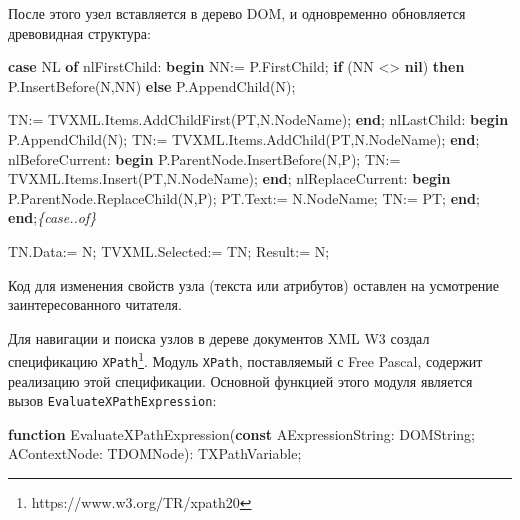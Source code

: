 \documentclass[
]{article}
\newenvironment{Shaded}{}{}
\newcommand{\CommentTok}[1]{\textcolor[rgb]{0.38,0.63,0.69}{\textit{#1}}}
\newcommand{\DataTypeTok}[1]{\textcolor[rgb]{0.56,0.13,0.00}{#1}}
\newcommand{\KeywordTok}[1]{\textcolor[rgb]{0.00,0.44,0.13}{\textbf{#1}}}
\newcommand{\NormalTok}[1]{#1}
\begin{document}
После этого узел вставляется в дерево DOM, и одновременно обновляется
древовидная структура:

\begin{Shaded}
\begin{Highlighting}[]
\KeywordTok{case}\NormalTok{ NL }\KeywordTok{of}
\NormalTok{     nlFirstChild:}
                  \KeywordTok{begin}
\NormalTok{                    NN:= P.FirstChild;}
                    \KeywordTok{if}\NormalTok{ (NN \textless{}\textgreater{} }\KeywordTok{nil}\NormalTok{) }\KeywordTok{then}
\NormalTok{                      P.InsertBefore(N,NN)}
                    \KeywordTok{else}
\NormalTok{                      P.AppendChild(N);}

\NormalTok{                    TN:= TVXML.Items.AddChildFirst(PT,N.NodeName);}
                  \KeywordTok{end}\NormalTok{;}
\NormalTok{      nlLastChild:}
                  \KeywordTok{begin}
\NormalTok{                    P.AppendChild(N);}
\NormalTok{                    TN:= TVXML.Items.AddChild(PT,N.NodeName);}
                  \KeywordTok{end}\NormalTok{;}
\NormalTok{  nlBeforeCurrent:}
                  \KeywordTok{begin}
\NormalTok{                    P.ParentNode.InsertBefore(N,P);}
\NormalTok{                    TN:= TVXML.Items.Insert(PT,N.NodeName);}
                  \KeywordTok{end}\NormalTok{;}
\NormalTok{ nlReplaceCurrent:}
                  \KeywordTok{begin}
\NormalTok{                    P.ParentNode.ReplaceChild(N,P);}
\NormalTok{                    PT.}\DataTypeTok{Text}\NormalTok{:= N.NodeName;}
\NormalTok{                    TN:= PT;}
                  \KeywordTok{end}\NormalTok{;}
  \KeywordTok{end}\NormalTok{;}\CommentTok{\{case..of\}}

\NormalTok{  TN.Data:= N;}
\NormalTok{  TVXML.Selected:= TN;}
\NormalTok{  Result:= N;}
\end{Highlighting}
\end{Shaded}

Код для изменения свойств узла (текста или атрибутов) оставлен на
усмотрение заинтересованного читателя.

Для навигации и поиска узлов в дереве документов XML W3 создал
спецификацию \texttt{XPath}\footnote{https://www.w3.org/TR/xpath20}.
Модуль \texttt{XPath}, поставляемый с Free Pascal, содержит реализацию
этой спецификации. Основной функцией этого модуля является вызов
\texttt{EvaluateXPathExpression}:

\begin{Shaded}
\begin{Highlighting}[]
\KeywordTok{function}\NormalTok{ EvaluateXPathExpression(}\KeywordTok{const}\NormalTok{ AExpressionString: DOMString; AContextNode: TDOMNode): TXPathVariable;}
\end{Highlighting}
\end{Shaded}
\end{document}
